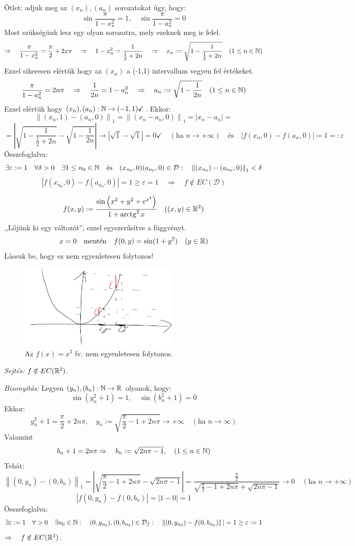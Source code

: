 \documentclass[a4paper,11.5pt]{article}
\DeclareMathOperator{\arctg}{arc tg}
\newcommand{\norm}[1]{\left\lVert#1\right\rVert}
\begin{document}
\begin{task}
		Ötlet: adjuk meg az $(x_n),(a_n)$ sorozatokat úgy, hogy:
		\[ \sin\frac{\pi}{1-x_n^2}=1,\quad \sin\frac{\pi}{1-a_n^2}=0 \]
		Most szükségünk lesz egy olyan sorozatra, mely ezeknek meg is felel.
		\[ \Rightarrow\quad \frac{\pi}{1-x_n^2}=\frac{\pi}{2}+2x\pi \quad \Rightarrow\quad 1-x_n^2=\frac{1}{\frac{1}{2}+2n}\quad \Rightarrow\quad x_n:=\sqrt{1-\frac{1}{\frac{1}{2}+2n}}\quad (1\leq n\in\mathbb{N})  \]
		Ezzel sikeresen elértük hogy az $(x_n)$ a (-1,1) intervallum vegyen fel értékeket.
		\[ \frac{\pi}{1-a_n^2}=2n\pi\quad \Rightarrow\quad \frac{1}{2n}=1-a_n^2\quad \Rightarrow\quad a_n:=\sqrt{1-\frac{1}{2n}}\quad (1\leq n\in\mathbb{N}) \]
		Ezzel elértük hogy $(x_n),(a_n):\mathbb{N}\to(-1,1)\checkmark$. Ekkor:
		\[ \norm{(x_n,1)-(a_n,0)}_1=\norm{(x_n-a_n,0)}_1=|x_n-a_n|=\]
		\[=\left|\sqrt{1-\frac{1}{\frac{1}{2}+2n}}-\sqrt{1-\frac{1}{2n}}\right|\to|\sqrt{1}-\sqrt{1}|=0\checkmark\quad (\text{ha } n\to+\infty )\quad \text{és}\quad |f(x_n,0)-f(a_n,0)|=1=:\varepsilon \]
		Összefoglalva:
		\[ \exists\varepsilon:=1\quad \forall\delta>0\quad \exists1\leq n_0\in\N\quad \text{és}\quad (x_{n_0},0)(a_{n_0},0)\in \mathcal{D}:\quad \norm{(x_{n_0})-(a_{n_0},0)}_1<\delta\]
		\[ |f(x_{n_0},0)-f(a_{n_0},0)|=1 \geq\varepsilon=1\quad \Rightarrow\quad f\notin EC(\mathcal{D}) \]
		
	\end{task}
	\begin{task}
		\[ f(x,y):=\frac{\sin\left(x^2+y^2+e^{x^4}\right)}{1+\arctg^2x}\quad ((x,y)\in\R^2) \]
		,,Lőjünk ki egy változót'', ezzel egyszerűsítve a függvényt.
		\[ x=0\quad \text{mentén}\quad f(0,y)=\sin(1+y^2)\quad (y\in\mathbb{R}) \]
		Lássuk be, hogy ez nem egyenletesen folytonos!
		
		\begin{figure}[H]
			\centering
			\includegraphics[height=4cm]{kepek/54.png}
			\caption{Az $f(x)=x^2$ fv. nem egyenletesen folytonos.}
		\end{figure}
		
		\textit{Sejtés:} $f\notin EC(\mathbb{R}^2)$.
		
		\textit{Bizonyítás:} Legyen $(y_n),(b_n):\mathbb{N}\to\mathbb{R}$ olyanok, hogy:
		\[ \sin(y_n^2+1)=1,\quad \sin(b_n^2+1)=0 \]
		Ekkor:
		\[ y_n^2+1=\frac{\pi}{2}+2n\pi,\quad y_n:=\sqrt{\frac{\pi}{2}-1+2n\pi}\to+\infty\quad (\text{ha }n\to\infty) \]
		Valamint
		\[ b_n+1=2n\pi\Rightarrow\quad b_n:=\sqrt{2n\pi-1},\quad (1\leq n\in\mathbb{N}) \]
		Tehát:
		\[ \norm{(0,y_n)-(0,b_n)}_1=\left|\sqrt{\frac{\pi}{2}-1+2n\pi}-\sqrt{2n\pi-1}\right|=\frac{\frac{\pi}{2}}{\sqrt{\frac{\pi}{2}-1+2n\pi}+\sqrt{2n\pi-1}}\to0\quad (\text{ha }n\to+\infty) \]
		\[ |f(0,y_n)-f(0,b_n)|=|1-0|=1 \]
		Összefoglalva:
		\[ \exists\varepsilon:=1\quad \forall>0\quad \exists n_0\in\N:\quad (0,y_{n_0}),(0,b_{n_0})\in\mathcal{D}_f:\quad \norm{(0,y_{n_0})-f(0,b_{n_0})}|=1\geq\varepsilon:=1 \]
		$\Rightarrow\quad f\notin EC(\mathbb{R}^2)$.
	\end{task}
\end{document}
